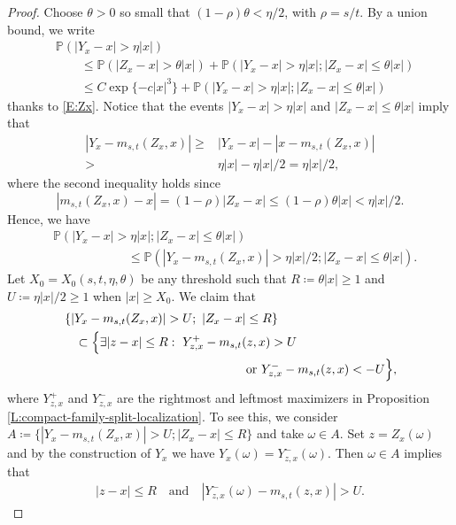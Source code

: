\documentclass[12pt, reqno]{amsart}
\numberwithin{equation}{section}
\theoremstyle{definition}
\newcommand{\Prob}{\mathbb{P}}
\begin{document}
\begin{proof}
  Choose $\theta>0$ so small that $(1-\rho)\theta<\eta/2$, with $\rho=s/t$. By a
  union bound, we write
  \begin{align}\label{E:P1}
  & \Prob(|Y_x-x|>\eta |x|) \nonumber                                                                     \\
  & \qquad\leq     \Prob(|Z_x-x|>\theta |x|) +   \Prob(|Y_x-x|>\eta |x|; |Z_x-x|\leq \theta |x|)\nonumber \\
  & \qquad \leq C\exp\{-c |x|^3\}+   \Prob(|Y_x-x|>\eta |x|; |Z_x-x|\leq \theta |x|)
  \end{align}
  thanks to \eqref{E:Zx}. Notice that the events $|Y_x-x|>\eta|x|$ and
  $|Z_x-x|\le\theta|x|$ imply that
  \begin{align*}
    |Y_x-m_{s,t}(Z_x,x)| \geq & |Y_x-x| -|x -m_{s,t}(Z_x,x)| \\
                         >    & \eta|x|-\eta|x|/2=\eta|x|/2,
  \end{align*}
  where the second inequality holds since
  \[
    |m_{s,t}(Z_x,x)-x|=(1-\rho)|Z_x-x|\le (1-\rho)\theta |x|< \eta |x|/2.
  \]
  Hence, we have
  \begin{align*}
    & \Prob(|Y_x-x|>\eta |x|; |Z_x-x|\leq \theta |x|) \\
    & \qquad \qquad \qquad \leq \Prob(  |Y_x-m_{s,t}(Z_x,x)|>\eta |x|/2; |Z_x-x|\leq \theta |x|).
  \end{align*}
   Let $X_0=X_0(s,t,\eta,\theta)$ be any threshold such that $R \coloneqq \theta
   |x|\ge1$ and $U \coloneqq \eta |x|/2\ge1$ when $|x|\ge X_0$. We claim that
  \begin{align*}
    &\left\{|Y_x-m_{s,t}(Z_x,x)|>U;\ |Z_x-x|\le R\right\}\\
    &\quad\subset
      \Big\{\exists |z-x|\le R:\
      Y_{z,x}^+-m_{s,t}(z,x)>U\\
    &\hspace{2.05in}\text{or }Y_{z,x}^--m_{s,t}(z,x)<-U\Big\},
  \end{align*}
  where $Y_{z,x}^+$ and $Y_{z,x}^-$ are the rightmost and leftmost maximizers in
  Proposition \ref{L:compact-family-split-localization}. To see this, we
  consider $A \coloneqq \{ |Y_x-m_{s,t}(Z_x,x)|>U; |Z_x-x|\leq R\}$ and take
  $\omega\in A$. Set $z=Z_x(\omega)$ and by the construction of $Y_x$ we have
  $Y_x(\omega)=Y_{z,x}^-(\omega)$. Then $\omega\in A$ implies that
  \begin{align*}
  |z-x|\leq R\quad \text{and} \quad |Y_{z,x}^-(\omega) -m_{s,t}(z,x)| >U.
  \end{align*}

\end{proof}
\end{document}
